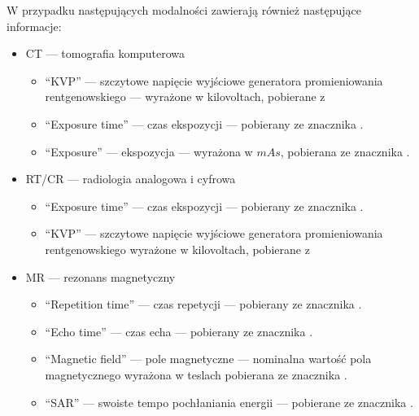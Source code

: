 W przypadku następujących modalności zawierają również następujące informacje:
\begin{itemize}
    \item CT --- tomografia komputerowa
          \begin{itemize}
              \item \enquote{KVP} --- szczytowe napięcie wyjściowe generatora promieniowania rentgenowskiego --- wyrażone w kilovoltach, pobierane z 
              \item \enquote{Exposure time} --- czas ekspozycji --- pobierany ze znacznika .
              \item \enquote{Exposure} --- ekspozycja --- wyrażona w $mAs$, pobierana ze znacznika .
          \end{itemize}

    \item RT/CR --- radiologia analogowa i cyfrowa
          \begin{itemize}
              \item \enquote{Exposure time} --- czas ekspozycji --- pobierany ze znacznika .
              \item \enquote{KVP} --- szczytowe napięcie wyjściowe generatora promieniowania rentgenowskiego wyrażone w kilovoltach, pobierane z 
          \end{itemize}

    \item MR --- rezonans magnetyczny
          \begin{itemize}
              \item \enquote{Repetition time} --- czas repetycji --- pobierany ze znacznika .
              \item \enquote{Echo time} --- czas echa --- pobierany ze znacznika .
              \item \enquote{Magnetic field} --- pole magnetyczne --- nominalna wartość pola magnetycznego wyrażona w teslach pobierana ze znacznika .
              \item \enquote{SAR} --- swoiste tempo pochłaniania energii --- pobierane ze znacznika .
          \end{itemize}
\end{itemize}
